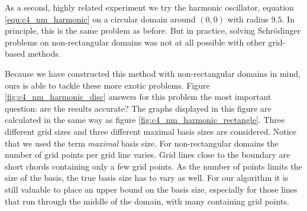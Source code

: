As a second, highly related experiment we try the harmonic oscillator, equation \eqref{equ:c4_nm_harmonic} on a circular domain around $(0, 0)$ with radius $9.5$. In principle, this is the same problem as before. But in practice, solving Schrödinger problems on non-rectangular domains was not at all possible with other grid-based methods.

Because we have constructed this method with non-rectangular domains in mind, ours is able to tackle these more exotic problems. Figure \ref{fig:c4_nm_harmonic_disc} answers for this problem the most important question: are the results accurate? The graphs displayed in this figure are calculated in the same way as figure \ref{fig:c4_nm_harmonic_rectangle}. Three different grid sizes and three different maximal basis sizes are considered. Notice that we used the term \emph{maximal} basis size. For non-rectangular domains the number of grid points per grid line varies. Grid lines close to the boundary are short chords containing only a few grid points. As the number of points limits the size of the basis, the true basis size has to vary as well. For our algorithm it is still valuable to place an upper bound on the basis size, especially for those lines that run through the middle of the domain, with many containing grid points.

